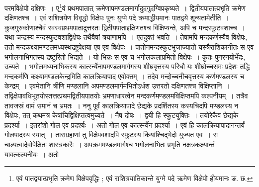 \documentclass[11pt, openany]{book}
\begin{document}
\newpage 

\noindent परमविक्षेपो दक्षिणः~। ए\renewcommand{\thefootnote}{१}\footnote{एवं पातद्वयात्प्रभृति क्रमेण विक्षेपवृद्धिः ; एवं राशित्रयातिकान्ते युग्मे पदे ऋमेण विक्षेपो हीयमानः ङ. छ.}वं प्रथमपातात् क्रमेणापमण्डलमार्गादुदगुदग्विप्रकृष्यते~। द्वितीयपातात्प्रभृति क्रमेण दक्षिणतश्च~। एवं राशित्रयेण विवृद्धो विक्षेपः पुनः युग्मे पदे क्रमाद्धीयमानः पातद्वये शून्यतामेतीति~। कुजगुरुकोणाश्चैवं स्वस्वप्रथमपातादुत्तरतः द्वितीयपाताद्दक्षिणतश्च विक्षिप्यन्ते, अपि च मन्दस्फुटवशाच्च~। यथा चन्द्रस्य मन्दस्फुटवशाद्विक्षेपः तथैवैषां त्रयाणामपि~। एतदुक्तं भवति~। तेषामपि मन्दकर्णस्यैव विक्षेपः, ततो मन्दकक्ष्यामण्डलमध्यस्थद्रष्ट्रपेक्षया एष एव विक्षेपः~। 
पातोनमन्दस्फुटभुजाज्यातो यस्त्रैराशिकानीतः स एव भगोलनाभिगतस्य द्रष्टुरितो भिद्यते~। यो भिन्नः स एव च भगोलकलाप्रमितो विक्षेपः~। कुतः पुनरनयोर्भेदः, उच्यते~। भगोलमध्यनाभिकस्य कार्त्स्न्येनापमण्डलमार्गगस्य शीघ्रवृत्तस्य परिधौ यः शीघ्रोच्चसमः प्रदेशः तद्धि मन्दकर्मणि कक्ष्यामण्डलकेन्द्रमिति कालक्रियापाद एवोक्तम्~। तदेव मन्दोच्चनीचवृत्तस्य कर्णमण्डलस्य च केन्द्रम्~। एवमेतानि त्रीणि मण्डलानि अपमण्डलमार्गमभितोऽर्धश उत्तरतो दक्षिणतश्च विक्षिप्तानि~। तद्विक्षेपावधिभूतयोस्तत्तत्प्रथमद्वितीयपातयोः भ्रमणाधारत्वेन 
मन्दकर्णमण्डलमविक्षिप्तमपि कल्पनीयम्~। तत्रैव तावजस्रं वामं समानं च भ्रमतः~। ननु पूर्वं कालक्रियापादे छेद्यके प्रदर्शितस्य कस्यचिदपि मण्डलस्य न विक्षेपः, तत् कथमत्र केषांचिद्विक्षिप्तत्वमुच्यते~। नैष दोषः~। द्वयी हि स्फुटयुक्तिः~। तयोरेकैव छेद्यके प्रदर्श्या~। इतरांशो गोल एव प्रदर्श्यः~। अतो गोल एव कार्त्स्न्येन प्रदर्श्या~। एवं हि कालक्रियापादानन्तर्यं गोलपादस्य स्यात्~। ताराग्रहाणां तु विक्षेपवशादपि स्फुटस्य कियांश्चिद्भेदो युज्यत एव~। स चाल्पत्वादेवोपेक्षितः शास्त्रकारैः~। अपक्रममण्डलमार्गश्च भगोलनाभितः प्रभृति नक्षत्रकक्ष्यान्तं यावत्कल्पनीयः~। अतो 

\newpage
\end{document}
